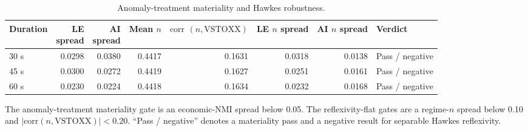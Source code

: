 
\begin{table}[!b]
\centering
\caption{Anomaly-treatment materiality and Hawkes robustness.}
\label{tab:anomaly_hawkes_robustness}
\scriptsize
\setlength{\tabcolsep}{2.5pt}
\begin{tabular}{lrrrrrrl}
\toprule
Duration & \shortstack{LE\\spread} & \shortstack{AI\\spread} &
\shortstack{Mean\\$n$} & \shortstack{$\mathrm{corr}$\\$(n,\mathrm{VSTOXX})$} &
\shortstack{LE $n$\\spread} & \shortstack{AI $n$\\spread} & Verdict\\
\midrule
30 s & 0.0298 & 0.0380 & 0.4417 & 0.1631 & 0.0318 & 0.0138 & Pass / negative\\
45 s & 0.0300 & 0.0272 & 0.4419 & 0.1627 & 0.0251 & 0.0161 & Pass / negative\\
60 s & 0.0230 & 0.0224 & 0.4418 & 0.1634 & 0.0232 & 0.0168 & Pass / negative\\
\bottomrule
\end{tabular}
\begin{minipage}{0.94\linewidth}\footnotesize
The anomaly-treatment materiality gate is an economic-NMI spread below 0.05.
The reflexivity-flat gates are a regime-$n$ spread below 0.10 and
$|\mathrm{corr}(n,\mathrm{VSTOXX})|<0.20$.  ``Pass / negative'' denotes a
materiality pass and a negative result for separable Hawkes reflexivity.
\end{minipage}
\end{table}
